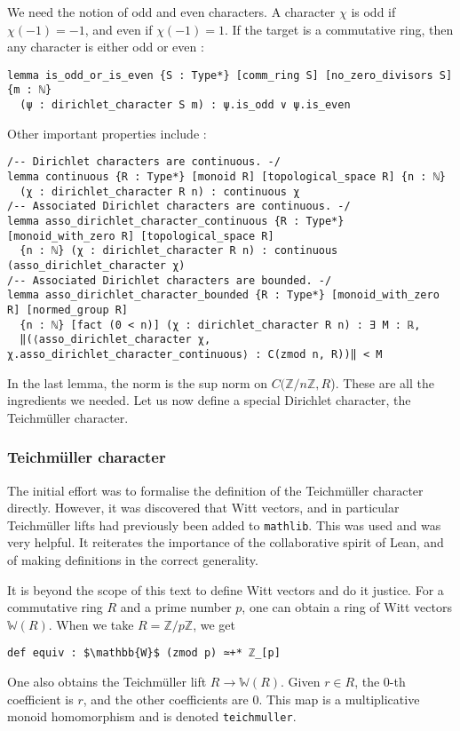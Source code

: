 \documentclass[a4paper,UKenglish,cleveref, autoref, thm-restate]{lipics-v2021}
\newcommand{\lean}[1]{\texttt{#1}\xspace} %
\begin{document}
\newline
We need the notion of odd and even characters. A character $\chi$ is odd if $\chi (-1) = -1$, and 
even if $\chi (-1) = 1$. If the target is a commutative ring, then any character is 
either odd or even : 
\begin{lstlisting}
lemma is_odd_or_is_even {S : Type*} [comm_ring S] [no_zero_divisors S] {m : ℕ} 
  (ψ : dirichlet_character S m) : ψ.is_odd ∨ ψ.is_even
\end{lstlisting}
Other important properties include : 
\begin{lstlisting}
/-- Dirichlet characters are continuous. -/
lemma continuous {R : Type*} [monoid R] [topological_space R] {n : ℕ} 
  (χ : dirichlet_character R n) : continuous χ
/-- Associated Dirichlet characters are continuous. -/
lemma asso_dirichlet_character_continuous {R : Type*} [monoid_with_zero R] [topological_space R] 
  {n : ℕ} (χ : dirichlet_character R n) : continuous (asso_dirichlet_character χ) 
/-- Associated Dirichlet characters are bounded. -/
lemma asso_dirichlet_character_bounded {R : Type*} [monoid_with_zero R] [normed_group R] 
  {n : ℕ} [fact (0 < n)] (χ : dirichlet_character R n) : ∃ M : ℝ,
  ‖(⟨asso_dirichlet_character χ, χ.asso_dirichlet_character_continuous⟩ : C(zmod n, R))‖ < M 
\end{lstlisting}
In the last lemma, the norm is the sup norm on $C(\mathbb{Z}/n \mathbb{Z}, R$). 
These are all the ingredients we needed. Let us now define a special Dirichlet character, the Teichmüller character.
\subsubsection{Teichmüller character}
The initial effort was to formalise the definition of the Teichmüller character directly. 
However, it was discovered that Witt vectors, and in particular Teichmüller lifts had previously 
been added to \lean{mathlib}. This was used and was very helpful. It reiterates the importance 
of the collaborative spirit of Lean, and of making definitions in the correct generality. 

It is beyond the scope of this text to define Witt vectors and do it justice. For a commutative ring
$R$ and a prime number $p$, one can obtain a ring of Witt vectors $\mathbb{W}(R)$.
When we take $R = \mathbb{Z}/p \mathbb{Z}$, we get 
\begin{lstlisting}
def equiv : $\mathbb{W}$ (zmod p) ≃+* ℤ_[p]
\end{lstlisting}
One also obtains the Teichmüller lift $R \to \mathbb{W} (R)$. Given $r \in R$, 
the 0-th coefficient is $r$, and the other coefficients are 0. This map is a 
multiplicative monoid homomorphism and is denoted \lean{teichmuller}. 
\end{document}
